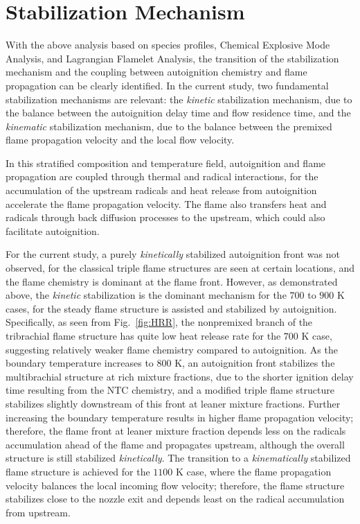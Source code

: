 \documentclass[review,3p,times]{elsarticle}
\begin{document}
\section{Stabilization Mechanism}
With the above analysis based on species profiles, Chemical Explosive Mode Analysis, and Lagrangian Flamelet Analysis, the transition of the stabilization mechanism and the coupling between autoignition chemistry and flame propagation can be clearly identified.  In the current study, two fundamental stabilization mechanisms are relevant: the \emph {kinetic} stabilization mechanism, due to the balance between the autoignition delay time and flow residence time, and the \emph {kinematic} stabilization mechanism, due to the balance between the premixed flame propagation velocity and the local flow velocity.  

In this stratified composition and temperature field, autoignition and flame propagation are coupled through thermal and radical interactions, for the accumulation of the upstream radicals and heat release from autoignition accelerate the flame propagation velocity.  The flame also transfers heat and radicals through back diffusion processes to the upstream, which could also facilitate autoignition.

For the current study, a purely \emph {kinetically} stabilized autoignition front was not observed, for the classical triple flame structures are seen at certain locations, and the flame chemistry is dominant at the flame front.  However, as demonstrated above, the \emph {kinetic} stabilization is the dominant mechanism for the $700$ to $900$ K cases, for the steady flame structure is assisted and stabilized by autoignition.  Specifically, as seen from Fig.~\ref{fig:HRR}, the nonpremixed branch of the tribrachial flame structure has quite low heat release rate for the $700$ K case, suggesting relatively weaker flame chemistry compared to autoignition.  As the boundary temperature increases to $800$ K, an autoignition front stabilizes the multibrachial structure at rich mixture fractions, due to the shorter ignition delay time resulting from the NTC chemistry, and a modified triple flame structure stabilizes slightly downstream of this front at leaner mixture fractions.  Further increasing the boundary temperature results in higher flame propagation velocity; therefore, the flame front at leaner mixture fraction depends less on the radicals accumulation ahead of the flame and propagates upstream, although the overall structure is still stabilized \emph {kinetically}.  The transition to a \emph {kinematically} stabilized flame structure is achieved for the $1100$ K case, where the flame propagation velocity balances the local incoming flow velocity; therefore, the flame structure stabilizes close to the nozzle exit and depends least on the radical accumulation from upstream.  
\end{document}
